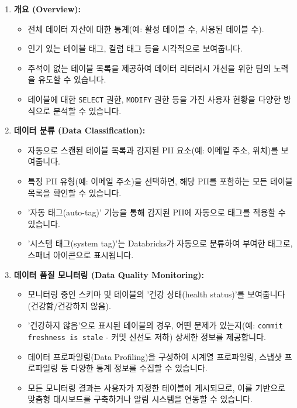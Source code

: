 \documentclass[11pt,a4paper]{article}
\theoremstyle{definition}
\begin{document}
\begin{enumerate}
    \item \textbf{개요 (Overview):}
    \begin{itemize}
        \item 전체 데이터 자산에 대한 통계(예: 활성 테이블 수, 사용된 테이블 수).
        \item 인기 있는 테이블 태그, 컬럼 태그 등을 시각적으로 보여줍니다.
        \item 주석이 없는 테이블 목록을 제공하여 데이터 리터러시 개선을 위한 팀의 노력을 유도할 수 있습니다.
        \item 테이블에 대한 \texttt{SELECT} 권한, \texttt{MODIFY} 권한 등을 가진 사용자 현황을 다양한 방식으로 분석할 수 있습니다.
    \end{itemize}
    \item \textbf{데이터 분류 (Data Classification):}
    \begin{itemize}
        \item 자동으로 스캔된 테이블 목록과 감지된 PII 요소(예: 이메일 주소, 위치)를 보여줍니다.
        \item 특정 PII 유형(예: 이메일 주소)을 선택하면, 해당 PII를 포함하는 모든 테이블 목록을 확인할 수 있습니다.
        \item '자동 태그(auto-tag)' 기능을 통해 감지된 PII에 자동으로 태그를 적용할 수 있습니다.
        \item '시스템 태그(system tag)'는 Databricks가 자동으로 분류하여 부여한 태그로, 스패너 아이콘으로 표시됩니다.
    \end{itemize}
    \item \textbf{데이터 품질 모니터링 (Data Quality Monitoring):}
    \begin{itemize}
        \item 모니터링 중인 스키마 및 테이블의 '건강 상태(health status)'를 보여줍니다 (건강함/건강하지 않음).
        \item '건강하지 않음'으로 표시된 테이블의 경우, 어떤 문제가 있는지(예: \texttt{commit freshness is stale} - 커밋 신선도 저하) 상세한 정보를 제공합니다.
        \item 데이터 프로파일링(Data Profiling)을 구성하여 시계열 프로파일링, 스냅샷 프로파일링 등 다양한 통계 정보를 수집할 수 있습니다.
        \item 모든 모니터링 결과는 사용자가 지정한 테이블에 게시되므로, 이를 기반으로 맞춤형 대시보드를 구축하거나 알림 시스템을 연동할 수 있습니다.
    \end{itemize}
\end{enumerate}
\end{document}
